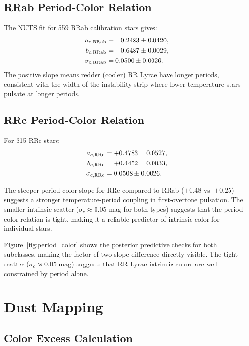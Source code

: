 \documentclass[10pt,preprint2]{aastex}
\begin{document}
\subsection{RRab Period-Color Relation}

The NUTS fit for 559 RRab calibration stars gives:
\begin{align}
  a_{c,\rm RRab} &= +0.2483 \pm 0.0420, \\
  b_{c,\rm RRab} &= +0.6487 \pm 0.0029, \\
  \sigma_{c,\rm RRab} &= 0.0500 \pm 0.0026.
\end{align}
The positive slope means redder (cooler) RR Lyrae have longer periods, consistent with the width of the instability strip where lower-temperature stars pulsate at longer periods.

\subsection{RRc Period-Color Relation}

For 315 RRc stars:
\begin{align}
  a_{c,\rm RRc} &= +0.4783 \pm 0.0527, \\
  b_{c,\rm RRc} &= +0.4452 \pm 0.0033, \\
  \sigma_{c,\rm RRc} &= 0.0508 \pm 0.0026.
\end{align}

The steeper period-color slope for RRc compared to RRab ($+0.48$ vs. $+0.25$) suggests a stronger temperature-period coupling in first-overtone pulsation. The smaller intrinsic scatter ($\sigma_{c} \approx 0.05$ mag for both types) suggests that the period-color relation is tight, making it a reliable predictor of intrinsic color for individual stars.

Figure~\ref{fig:period_color} shows the posterior predictive checks for both subclasses, making the factor-of-two slope difference directly visible. The tight scatter ($\sigma_c \approx 0.05$ mag) suggests that RR Lyrae intrinsic colors are well-constrained by period alone.

\section{Dust Mapping}
\label{sec:dust}

\subsection{Color Excess Calculation}
\end{document}
